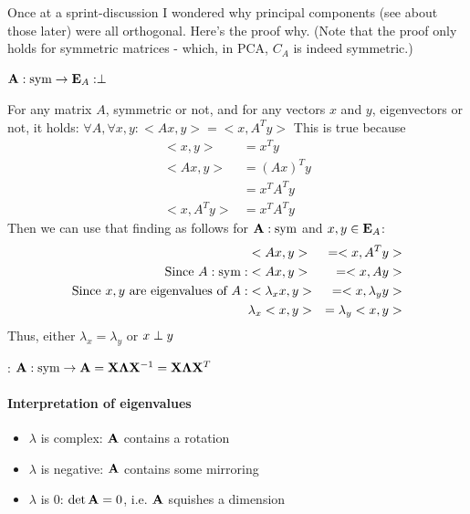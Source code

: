 Once at a sprint-discussion I wondered why principal components (see about those later) were all orthogonal. Here's the proof why. (Note that the proof only holds for symmetric matrices - which, in PCA, $C_A$ is indeed symmetric.)
\begin{theorem} \label{symm_then_orth}
    $\mathbf{A}: \text{sym} \to \mathbf{E}_A: \perp$

    For any matrix $A$, symmetric or not, and for any vectors $x$ and $y$, eigenvectors or not, it holds:
    $\forall A, \forall x, y: <Ax, y> = <x, A^Ty>$
    This is true because 
    \begin{equation}
        \begin{aligned}
            <x, y>      &= x^T y \\
            <Ax, y>     &= (Ax)^T y \\
                        &= x^T A^T y \\
            <x, A^Ty>   &= x^T A^T y
        \end{aligned}
    \end{equation}
    Then we can use that finding as follows for $\mathbf{A}: \text{sym}$ and $x, y \in \mathbf{E}_A$:
    \begin{equation}
        \begin{aligned}
                                                                & <Ax, y>           &= <x, A^Ty> \\
            \text{Since } A:\text{sym}:                              & <Ax, y>           &= <x, Ay> \\
            \text{Since } x, y \text{ are eigenvalues of } A:   & <\lambda_x x, y>  &= <x, \lambda_y y> \\
                                                                & \lambda_x <x, y>  &= \lambda_y <x, y>
        \end{aligned}
    \end{equation}
    Thus, either $\lambda_x = \lambda_y$ or $x \perp y$ 
\end{theorem}

\begin{theorem}
    : $\mathbf{A}: \text{sym} \to \mathbf{A} = \mathbf{X} \mathbf{\Lambda} \mathbf{X}^{-1} = \mathbf{X} \mathbf{\Lambda} \mathbf{X}^T$
\end{theorem}

\paragraph{Interpretation of eigenvalues}
\begin{itemize}
    \item $\lambda$ is complex: $\mathbf{A}$ contains a rotation
    \item $\lambda$ is negative: $\mathbf{A}$ contains some mirroring
    \item $\lambda$ is 0: $\det{\ensuremath{\mathbf{A}}} = 0$, i.e. $\mathbf{A}$ squishes a dimension
\end{itemize}




